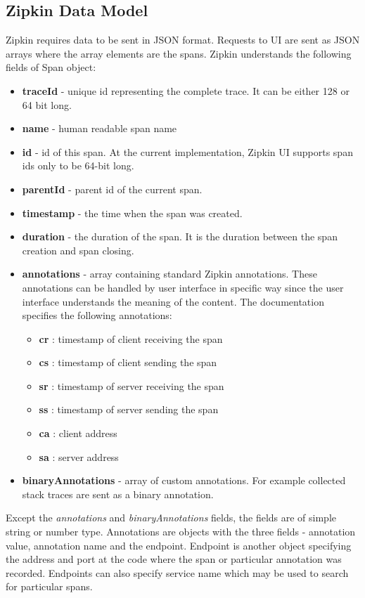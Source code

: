 \subsection{Zipkin Data Model}
Zipkin requires data to be sent in JSON format. Requests to UI are sent as JSON arrays where the array elements are the spans. Zipkin understands the following fields of Span object:
\begin{itemize}
	\item \textbf{traceId} - unique id representing the complete trace. It can be either 128 or 64 bit long.
	\item \textbf{name} - human readable span name
	\item \textbf{id} - id of this span. At the current implementation, Zipkin UI supports span ids only to be 64-bit long.
	\item \textbf{parentId} - parent id of the current span.
	\item \textbf{timestamp} - the time when the span was created.
	\item \textbf{duration} - the duration of the span. It is the duration between the span creation and span closing.
	\item \textbf{annotations} - array containing standard Zipkin annotations. These annotations can be handled by user interface in specific way since the user interface understands the meaning of the content. The documentation specifies the following annotations:
	\begin{itemize}
		\item \textbf{cr} : timestamp of client receiving the span
		\item \textbf{cs} : timestamp of client sending the span
		\item \textbf{sr} : timestamp of server receiving the span
		\item \textbf{ss} : timestamp of server sending the span
		\item \textbf{ca} : client address
		\item \textbf{sa} : server address
	\end{itemize}
	\item \textbf{binaryAnnotations} - array of custom annotations. For example collected stack traces are sent as a binary annotation.
\end{itemize}

Except the \textit{annotations} and \textit{binaryAnnotations} fields, the fields are of simple string or number type. Annotations are objects with the three fields - annotation value, annotation name and the endpoint. Endpoint is another object specifying the address and port at the code where the span or particular annotation was recorded. Endpoints can also specify service name which may be used to search for particular spans.

